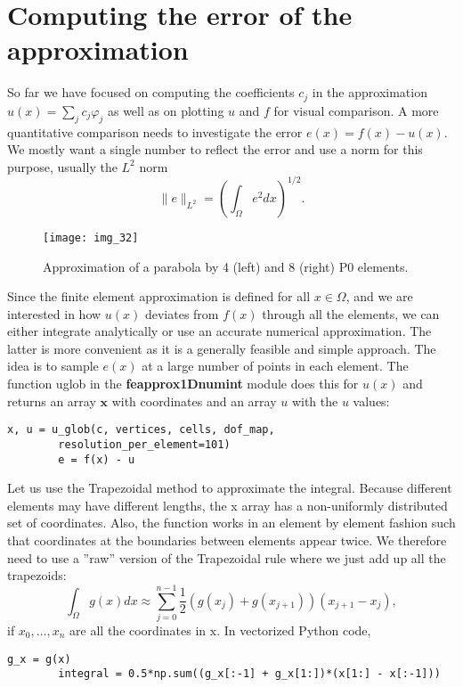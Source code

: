 \documentclass[../main.tex]{subfiles}
\begin{document}
	\section[Computing the error of the approximation]{Computing the error of the approximation}
	\label{sec:sec_6_4}
	So far we have focused on computing the coefficients $c_{j}$ in the approximation $u(x)=\sum_{j} c_{j} \varphi_{j}$ as well as on plotting $u$ and $f$ for visual comparison. A more quantitative comparison needs to investigate the error $e(x)=f(x)-u(x)$. We mostly want a single number to reflect the error and use a norm for this purpose, usually the $L^{2}$ norm
	$$
	\|e\|_{L^{2}}=\left(\int_{\Omega} e^{2} d x\right)^{1 / 2}.
	$$
	\begin{figure}[H]
		\centering
		\texttt{[image: img\_32]}
		\caption{Approximation of a parabola by 4 (left) and 8 (right) P0 elements.}
		\label{fig:img_32}
	\end{figure}
	\noindent Since the finite element approximation is defined for all $x \in \Omega$, and we are interested in how $u(x)$ deviates from $f(x)$ through all the elements, we can either integrate analytically or use an accurate numerical approximation. The latter is more convenient as it is a generally feasible and simple approach. The idea is to sample $e(x)$ at a large number of points in each element. The function u\textunderscore glob in the \textbf{fe\textunderscore approx1D\textunderscore numint}  module does this for $u(x)$ and returns an array $\mathbf{x}$ with coordinates and an array $u$ with the $u$ values:
	\begin{lstlisting}[numbers=none]
		x, u = u_glob(c, vertices, cells, dof_map,
		resolution_per_element=101)
		e = f(x) - u
	\end{lstlisting}
	Let us use the Trapezoidal method to approximate the integral. Because different
	elements may have different lengths, the x array has a non-uniformly distributed
	set of coordinates. Also, the   function works in an element by element
	fashion such that coordinates at the boundaries between elements appear twice.
	We therefore need to use a ”raw” version of the Trapezoidal rule where we just
	add up all the trapezoids:
	$$
	\int_{\Omega} g(x) d x \approx \sum_{j=0}^{n-1} \frac{1}{2}\left(g\left(x_{j}\right)+g\left(x_{j+1}\right)\right)\left(x_{j+1}-x_{j}\right),
	$$
	if $x_{0}, \ldots, x_{n}$ are all the coordinates in $\mathrm{x}$. In vectorized Python code,
	\begin{lstlisting}[numbers=none]
		g_x = g(x)
		integral = 0.5*np.sum((g_x[:-1] + g_x[1:])*(x[1:] - x[:-1]))	
	\end{lstlisting}
\end{document}
